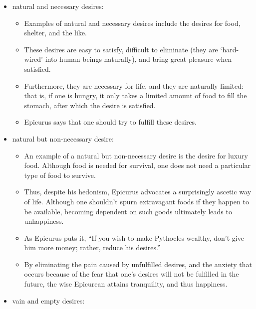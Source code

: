 \documentclass[]{article}
\begin{document}
\begin{itemize}
\itemsep1pt\parskip0pt
\item
  natural and necessary desires:

  \begin{itemize}
  \itemsep1pt\parskip0pt
  \item
    Examples of natural and necessary desires include the desires for
    food, shelter, and the like.
  \item
    These desires are easy to satisfy, difficult to eliminate (they are
    `hard-wired' into human beings naturally), and bring great pleasure
    when satisfied.
  \item
    Furthermore, they are necessary for life, and they are naturally
    limited: that is, if one is hungry, it only takes a limited amount
    of food to fill the stomach, after which the desire is satisfied.
  \item
    Epicurus says that one should try to fulfill these desires.
  \end{itemize}
\item
  natural but non-necessary desire:

  \begin{itemize}
  \itemsep1pt\parskip0pt
  \item
    An example of a natural but non-necessary desire is the desire for
    luxury food. Although food is needed for survival, one does not need
    a particular type of food to survive.
  \item
    Thus, despite his hedonism, Epicurus advocates a surprisingly
    ascetic way of life. Although one shouldn't spurn extravagant foods
    if they happen to be available, becoming dependent on such goods
    ultimately leads to unhappiness.
  \item
    As Epicurus puts it, ``If you wish to make Pythocles wealthy, don't
    give him more money; rather, reduce his desires.''
  \item
    By eliminating the pain caused by unfulfilled desires, and the
    anxiety that occurs because of the fear that one's desires will not
    be fulfilled in the future, the wise Epicurean attains tranquility,
    and thus happiness.
  \end{itemize}
\item
  vain and empty desires:


\end{itemize}
\end{document}
